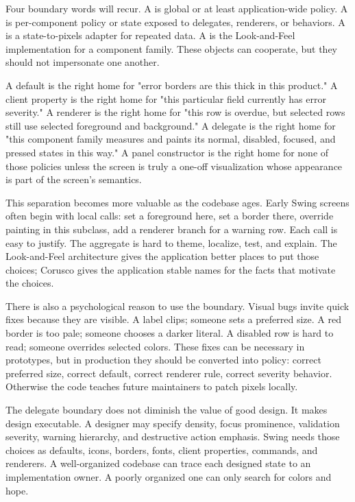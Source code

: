 Four boundary words will recur. A  is global or at least application-wide policy. A  is per-component policy or state exposed to delegates, renderers, or behaviors. A  is a state-to-pixels adapter for repeated data. A  is the Look-and-Feel implementation for a component family. These objects can cooperate, but they should not impersonate one another.

A default is the right home for "error borders are this thick in this product." A client property is the right home for "this particular field currently has error severity." A renderer is the right home for "this row is overdue, but selected rows still use selected foreground and background." A delegate is the right home for "this component family measures and paints its normal, disabled, focused, and pressed states in this way." A panel constructor is the right home for none of those policies unless the screen is truly a one-off visualization whose appearance is part of the screen's semantics.

This separation becomes more valuable as the codebase ages. Early Swing screens often begin with local calls: set a foreground here, set a border there, override painting in this subclass, add a renderer branch for a warning row. Each call is easy to justify. The aggregate is hard to theme, localize, test, and explain. The Look-and-Feel architecture gives the application better places to put those choices; Corusco gives the application stable names for the facts that motivate the choices.

There is also a psychological reason to use the boundary. Visual bugs invite quick fixes because they are visible. A label clips; someone sets a preferred size. A red border is too pale; someone chooses a darker literal. A disabled row is hard to read; someone overrides selected colors. These fixes can be necessary in prototypes, but in production they should be converted into policy: correct preferred size, correct default, correct renderer rule, correct severity behavior. Otherwise the code teaches future maintainers to patch pixels locally.

The delegate boundary does not diminish the value of good design. It makes design executable. A designer may specify density, focus prominence, validation severity, warning hierarchy, and destructive action emphasis. Swing needs those choices as defaults, icons, borders, fonts, client properties, commands, and renderers. A well-organized codebase can trace each designed state to an implementation owner. A poorly organized one can only search for colors and hope.


